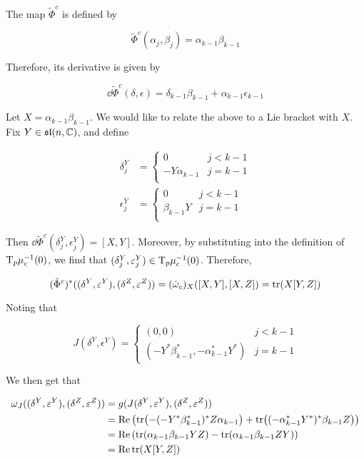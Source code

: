 \documentclass{report}
\renewcommand{\sl}{\mathfrak{sl}}
\begin{document}
The map \(\tilde\Phi^c\) is defined by

\[\tilde\Phi^c(\alpha_j, \beta_j) = \alpha_{k-1}\beta_{k-1}\]

Therefore, its derivative is given by

\[\dd\tilde\Phi^c(\delta, \epsilon) = \delta_{k-1}\beta_{k-1} + \alpha_{k-1}\epsilon_{k-1}\]

Let \(X = \alpha_{k-1}\beta_{k-1}\). We would like to relate the above to a Lie bracket with \(X\). Fix \(Y \in \sl(n, \C)\), and define

\begin{align*}
    \delta^Y_j &= \begin{cases}
        0 & j < k - 1 \\
        -Y\alpha_{k-1} & j = k - 1 \\
    \end{cases} \\
    \epsilon^Y_j &= \begin{cases}
        0 & j < k - 1 \\
        \beta_{k-1}Y & j = k - 1 \\
    \end{cases}
\end{align*}

Then \(\dd\tilde\Phi^c(\delta^Y_j, \epsilon^Y_j) = [X, Y]\). Moreover, by substituting into the definition of \(\mathrm{T}_p\mu_c^{-1}(0)\), we find that \((\delta^Y_j, \varepsilon^Y_j) \in \mathrm{T}_p\mu_c^{-1}(0)\). Therefore,

\[(\tilde\Phi^c)^*((\delta^Y, \varepsilon^Y), (\delta^Z, \varepsilon^Z)) = (\hat\omega_c)_X([X, Y], [X, Z]) = \tr(X[Y, Z])\]

Noting that

\[J(\delta^Y, \epsilon^Y) = \begin{cases}
    (0, 0) & j < k - 1 \\
    (-Y^*\beta_{k-1}^*, -\alpha_{k-1}^*Y^*) & j = k - 1
\end{cases}\]

We then get that

\begin{align*}
    \omega_J((\delta^Y, \varepsilon^Y), (\delta^Z, \varepsilon^Z)) &= g(J(\delta^Y, \varepsilon^Y), (\delta^Z, \varepsilon^Z)) \\
    &= \Re \left(\tr(-(-Y^*\beta_{k-1}^*)^*Z\alpha_{k-1}) + \tr((-\alpha_{k-1}^*Y^*)^*\beta_{k-1}Z)\right) \\
    &= \Re\left(\tr(\alpha_{k-1}\beta_{k-1}YZ) - \tr(\alpha_{k-1}\beta_{k-1}ZY)\right) \\
    &= \Re \tr(X[Y, Z])
\end{align*}
\end{document}
